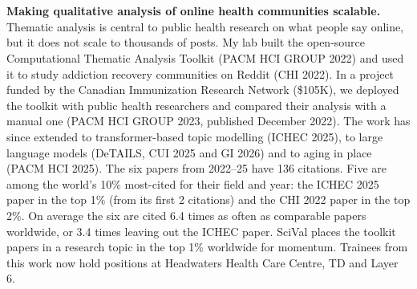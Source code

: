 \documentclass[11pt]{article}
\begin{document}
\sectionbreak
{}
\\ \\
\textbf{Making qualitative analysis of online health communities scalable.} Thematic analysis is central to public health research on what people say online, but it does not scale to thousands of posts. My lab built the open-source Computational Thematic Analysis Toolkit (PACM HCI GROUP 2022) and used it to study addiction recovery communities on Reddit (CHI 2022). In a project funded by the Canadian Immunization Research Network (\$105K), we deployed the toolkit with public health researchers and compared their analysis with a manual one (PACM HCI GROUP 2023, published December 2022). The work has since extended to transformer-based topic modelling (ICHEC 2025), to large language models (DeTAILS, CUI 2025 and GI 2026) and to aging in place (PACM HCI 2025). The six papers from 2022--25 have 136 citations. Five are among the world's 10\% most-cited for their field and year: the ICHEC 2025 paper in the top 1\% (from its first 2 citations) and the CHI 2022 paper in the top 2\%. On average the six are cited 6.4 times as often as comparable papers worldwide, or 3.4 times leaving out the ICHEC paper. SciVal places the toolkit papers in a research topic in the top 1\% worldwide for momentum. Trainees from this work now hold positions at Headwaters Health Care Centre, TD and Layer 6.
\\ \\
\end{document}
